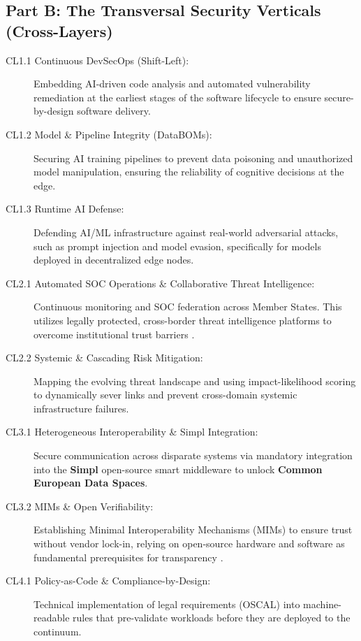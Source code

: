 \documentclass{ieeeaccess}
\begin{document}
\subsection*{Part B: The Transversal Security Verticals (Cross-Layers)}
\begin{description}
\item[CL1.1 Continuous DevSecOps (Shift-Left):] Embedding AI-driven code analysis and automated vulnerability remediation at the earliest stages of the software lifecycle to ensure secure-by-design software delivery.

\item[CL1.2 Model \& Pipeline Integrity (DataBOMs):] Securing AI training pipelines to prevent data poisoning and unauthorized model manipulation, ensuring the reliability of cognitive decisions at the edge.

\item[CL1.3 Runtime AI Defense:] Defending AI/ML infrastructure against real-world adversarial attacks, such as prompt injection and model evasion, specifically for models deployed in decentralized edge nodes.

\item[CL2.1 Automated SOC Operations \& Collaborative Threat Intelligence:] Continuous monitoring and SOC federation across Member States. This utilizes legally protected, cross-border threat intelligence platforms to overcome institutional trust barriers \cite{concordia}.

\item[CL2.2 Systemic \& Cascading Risk Mitigation:] Mapping the evolving threat landscape and using impact-likelihood scoring to dynamically sever links and prevent cross-domain systemic infrastructure failures.

\item[CL3.1 Heterogeneous Interoperability \& Simpl Integration:] Secure communication across disparate systems via mandatory integration into the \textbf{Simpl} open-source smart middleware \cite{cloud_edge_roadmap} to unlock \textbf{Common European Data Spaces}.

\item[CL3.2 MIMs \& Open Verifiability:] Establishing Minimal Interoperability Mechanisms (MIMs) to ensure trust without vendor lock-in, relying on open-source hardware and software as fundamental prerequisites for transparency \cite{cloud_edge_roadmap}.

\item[CL4.1 Policy-as-Code \& Compliance-by-Design:] Technical implementation of legal requirements (OSCAL) into machine-readable rules that pre-validate workloads before they are deployed to the continuum.


\end{description}
\end{document}
